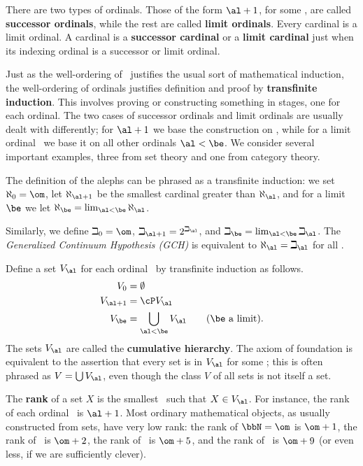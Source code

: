 \documentclass[12pt]{amsart}
\begin{document}
There are two types of ordinals.  Those of the form $\al+1$, for some
\al, are called \textbf{successor ordinals}, while the rest are called
\textbf{limit ordinals}.  Every cardinal is a limit ordinal.  A
cardinal is a \textbf{successor cardinal} or a \textbf{limit cardinal}
just when its indexing ordinal is a successor or limit ordinal.

Just as the well-ordering of \bbN\ justifies the usual sort of
mathematical induction, the well-ordering of ordinals justifies
definition and proof by \textbf{transfinite induction}.  This involves
proving or constructing something in stages, one for each ordinal.
The two cases of successor ordinals and limit ordinals are usually
dealt with differently; for $\al+1$ we base the construction on \al,
while for a limit ordinal \be\ we base it on all other ordinals
$\al<\be$.  We consider several important examples, three from set
theory and one from category theory.

\begin{eg}\label{thm:aleph-beth}
  The definition of the alephs can be phrased as a transfinite
  induction: we set $\aleph_0=\om$, let $\aleph_{\al+1}$ be the
  smallest cardinal greater than $\aleph_\al$, and for a limit $\be$
  we let $\aleph_\be = \lim_{\al<\be} \aleph_\al$.

  Similarly, we define $\beth_0=\om$, $\beth_{\al+1} = 2^{\beth_\al}$,
  and $\beth_\be = \lim_{\al<\be} \beth_\al$.  The \emph{Generalized
    Continuum Hypothesis (GCH)} is equivalent to
  $\aleph_\al=\beth_\al$ for all \al.
\end{eg}

\begin{eg}
  Define a set $V_\al$ for each ordinal \al\ by transfinite induction
  as follows.
  \begin{align*}
    V_0 &= \emptyset\\
    V_{\al+1} &= \cP V_\al\\
    V_\be &= \bigcup_{\al<\be} V_\al \qquad\text{($\be$ a limit)}.
  \end{align*}
  The sets $V_\al$ are called the \textbf{cumulative hierarchy}.  The
  axiom of foundation is equivalent to the assertion that every set is
  in $V_\al$ for some \al; this is often phrased as $V=\bigcup V_\al$,
  even though the class $V$ of all sets is not itself a set.

  The \textbf{rank} of a set $X$ is the smallest \al\ such that $X\in
  V_\al$.  For instance, the rank of each ordinal \al\ is $\al+1$.
  Most ordinary mathematical objects, as usually constructed from
  sets, have very low rank: the rank of $\bbN=\om$ is $\om+1$, the
  rank of \bbZ\ is $\om+2$, the rank of \bbQ\ is $\om+5$, and the rank
  of \bbR\ is $\om+9$ (or even less, if we are sufficiently clever).
\end{eg}
\end{document}

